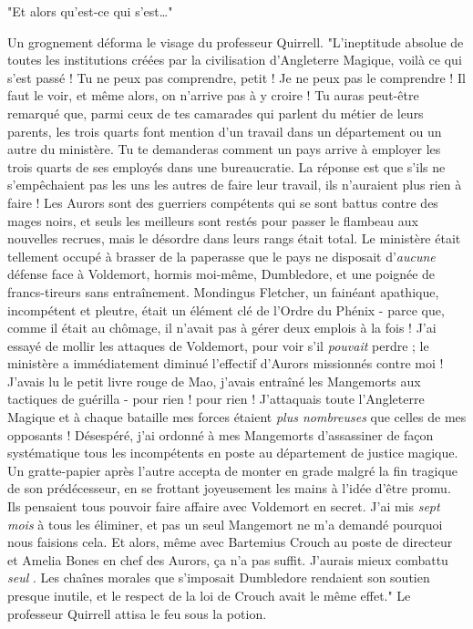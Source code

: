 "Et alors qu'est-ce qui s'est…"

Un grognement déforma le visage du professeur Quirrell. "L'ineptitude absolue de toutes les institutions créées par la civilisation d'Angleterre Magique, voilà ce qui s'est passé ! Tu ne peux pas comprendre, petit ! Je ne peux pas le comprendre ! Il faut le voir, et même alors, on n'arrive pas à y croire ! Tu auras peut-être remarqué que, parmi ceux de tes camarades qui parlent du métier de leurs parents, les trois quarts font mention d'un travail dans un département ou un autre du ministère. Tu te demanderas comment un pays arrive à employer les trois quarts de ses employés dans une bureaucratie. La réponse est que s'ils ne s'empêchaient pas les uns les autres de faire leur travail, ils n'auraient plus rien à faire ! Les Aurors sont des guerriers compétents qui se sont battus contre des mages noirs, et seuls les meilleurs sont restés pour passer le flambeau aux nouvelles recrues, mais le désordre dans leurs rangs était total. Le ministère était tellement occupé à brasser de la paperasse que le pays ne disposait d'\emph{aucune}  défense face à Voldemort, hormis moi-même, Dumbledore, et une poignée de francs-tireurs sans entraînement. Mondingus Fletcher, un fainéant apathique, incompétent et pleutre, était un élément clé de l'Ordre du Phénix - parce que, comme il était au chômage, il n'avait pas à gérer deux emplois à la fois ! J'ai essayé de mollir les attaques de Voldemort, pour voir s'il \emph{pouvait}  perdre ; le ministère a immédiatement diminué l'effectif d'Aurors missionnés contre moi ! J'avais lu le petit livre rouge de Mao, j'avais entraîné les Mangemorts aux tactiques de guérilla - pour rien ! pour rien ! J'attaquais toute l'Angleterre Magique et à chaque bataille mes forces étaient \emph{plus nombreuses}  que celles de mes opposants ! Désespéré, j'ai ordonné à mes Mangemorts d'assassiner de façon systématique tous les incompétents en poste au département de justice magique. Un gratte-papier après l'autre accepta de monter en grade malgré la fin tragique de son prédécesseur, en se frottant joyeusement les mains à l'idée d'être promu. Ils pensaient tous pouvoir faire affaire avec Voldemort en secret. J'ai mis \emph{sept mois}  à tous les éliminer, et pas un seul Mangemort ne m'a demandé pourquoi nous faisions cela. Et alors, même avec Bartemius Crouch au poste de directeur et Amelia Bones en chef des Aurors, ça n'a pas suffit. J'aurais mieux combattu \emph{seul} . Les chaînes morales que s'imposait Dumbledore rendaient son soutien presque inutile, et le respect de la loi de Crouch avait le même effet." Le professeur Quirrell attisa le feu sous la potion.

